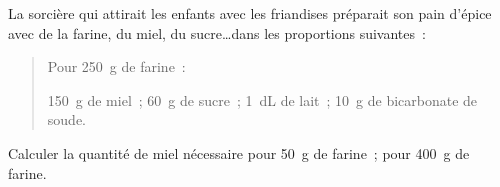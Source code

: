 La sorcière qui attirait les enfants avec les friandises préparait son pain d'épice avec de la farine, du miel, du sucre\ldots dans les proportions suivantes :
\begin{quote}
Pour 250~g de farine :\par
150~g de miel ; 60~g de sucre ; 1~dL de lait ; 10~g de bicarbonate de soude.
\end{quote}
Calculer la quantité de miel nécessaire pour 50~g de farine ; pour 400~g de farine.